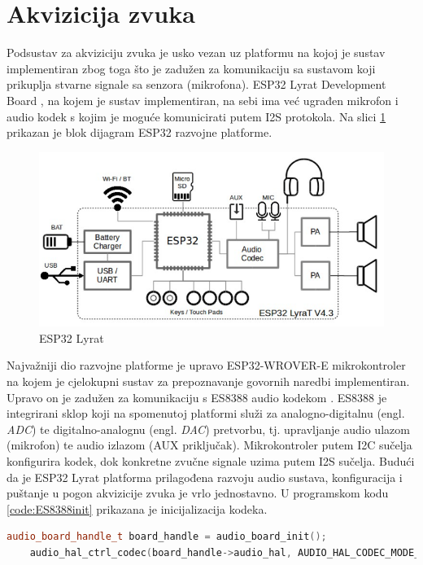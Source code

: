 \section{Akvizicija zvuka}
\label{sec:acq}

Podsustav za akviziciju zvuka je usko vezan uz platformu na kojoj
je sustav implementiran zbog toga što je zadužen za komunikaciju 
sa sustavom koji prikuplja stvarne signale sa senzora (mikrofona).
ESP32 Lyrat Development Board \cite{lyrat}, na kojem je sustav
implementiran, na sebi ima već ugrađen mikrofon i audio kodek
s kojim je moguće komunicirati putem I2S protokola. Na slici
\ref{pic:esp} prikazan je blok dijagram ESP32 razvojne platforme.

\begin{figure}[htb]
    \centering
    \includegraphics[width=0.75\linewidth]{Chapters/struktura_sustava/akvizicija/lyrat.png} 
    \caption{ESP32 Lyrat \cite{lyrat}}
    \label{pic:esp}
\end{figure}

Najvažniji dio razvojne platforme je upravo ESP32-WROVER-E mikrokontroler
na kojem je cjelokupni sustav za prepoznavanje govornih naredbi 
implementiran. Upravo on je zadužen za komunikaciju s ES8388 
audio kodekom \cite{es8388}. ES8388 je integrirani sklop koji na spomenutoj
platformi služi za analogno-digitalnu (engl. \textit{ADC}) te digitalno-analognu 
(engl. \textit{DAC}) pretvorbu, tj. upravljanje audio ulazom (mikrofon) te audio
izlazom (AUX priključak). Mikrokontroler putem I2C sučelja konfigurira kodek,
dok konkretne zvučne signale uzima putem I2S sučelja. Budući da je ESP32 Lyrat
platforma prilagođena razvoju audio sustava, konfiguracija i puštanje u pogon
akvizicije zvuka je vrlo jednostavno. U programskom kodu \ref{code:ES8388init}
prikazana je inicijalizacija kodeka.\\

\begin{lstlisting}[language=C++, caption=Inicijalizacija kodeka, label=code:ES8388init]
    audio_board_handle_t board_handle = audio_board_init();
    audio_hal_ctrl_codec(board_handle->audio_hal, AUDIO_HAL_CODEC_MODE_ENCODE, AUDIO_HAL_CTRL_START);
\end{lstlisting}

